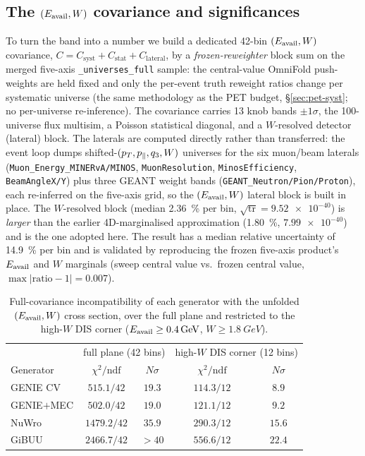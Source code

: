 \subsection{The $(E_{\mathrm{avail}},W)$ covariance and significances}
\label{sec:eavailw-cov}
To turn the band into a number we build a dedicated 42-bin $(E_{\mathrm{avail}},W)$
covariance, $C = C_{\mathrm{syst}}+C_{\mathrm{stat}}+C_{\mathrm{lateral}}$,
by a \emph{frozen-reweighter} block sum on the merged five-axis
\texttt{\_universes\_full} sample: the central-value OmniFold push-weights
are held fixed and only the per-event truth reweight ratios change per
systematic universe (the same methodology as the PET budget,
\S\ref{sec:pet-syst}; no per-universe re-inference). The covariance carries
13 knob bands $\pm1\sigma$, the 100-universe flux multisim, a Poisson
statistical diagonal, and a $W$-resolved detector (lateral) block. The
laterals are computed directly rather than transferred: the event loop dumps
shifted-$(p_{T},p_{\parallel},q_3,W)$ universes for the six muon/beam laterals
(\texttt{Muon\_Energy\_MINERvA/MINOS}, \texttt{MuonResolution},
\texttt{MinosEfficiency}, \texttt{BeamAngleX/Y}) plus three GEANT weight bands
(\texttt{GEANT\_Neutron/Pion/Proton}), each re-inferred on the five-axis grid,
so the $(E_{\mathrm{avail}},W)$ lateral block is built in place. The $W$-resolved block
(median \SI{2.36}{\percent} per bin, $\sqrt{\mathrm{tr}}=\num{9.52e-40}$) is
\emph{larger} than the earlier 4D-marginalised approximation
(\SI{1.80}{\percent}, $\num{7.99e-40}$) and is the one adopted here. The
result has a median relative uncertainty of \SI{14.9}{\percent} per bin and is
validated by reproducing the frozen five-axis product's $E_{\mathrm{avail}}$ and $W$
marginals (sweep central value vs.\ frozen central value,
$\max|\text{ratio}-1|=0.007$).

\begin{table}[H]
  \centering
  \begin{tabular}{@{}lcccc@{}}
    \toprule
    & \multicolumn{2}{c}{full plane (42 bins)} & \multicolumn{2}{c}{high-$W$ DIS corner (12 bins)} \\
    Generator & $\chi^{2}/\mathrm{ndf}$ & $N\sigma$ & $\chi^{2}/\mathrm{ndf}$ & $N\sigma$ \\
    \midrule
    GENIE CV     & $515.1/42$  & $19.3$ & $114.3/12$ & $8.9$ \\
    GENIE$+$MEC  & $502.0/42$  & $19.0$ & $121.1/12$ & $9.2$ \\
    NuWro        & $1479.2/42$ & $35.9$ & $290.3/12$ & $15.6$ \\
    GiBUU        & $2466.7/42$ & $>40$  & $556.6/12$ & $22.4$ \\
    \bottomrule
  \end{tabular}
  \caption{Full-covariance incompatibility of each generator with the
  unfolded $(E_{\mathrm{avail}},W)$ cross section, over the full plane and restricted to
  the high-$W$ DIS corner ($E_{\mathrm{avail}}\ge\SI{0.4}{GeV}$, $W\ge\SI{1.8}{GeV}$).}
  \label{tab:eavailW}
\end{table}

